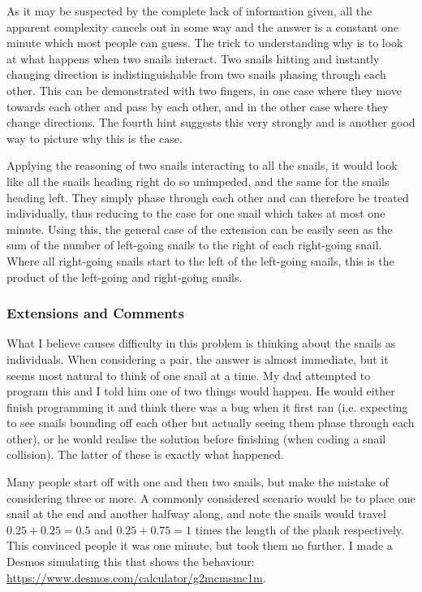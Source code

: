 As it may be suspected by the complete lack of information given, all the apparent complexity cancels out in some way and the answer is a constant one minute which most people can guess. The trick to understanding why is to look at what happens when two snails interact. Two snails hitting and instantly changing direction is indistinguishable from two snails phasing through each other. This can be demonstrated with two fingers, in one case where they move towards each other and pass by each other, and in the other case where they change directions. The fourth hint suggests this very strongly and is another good way to picture why this is the case.

Applying the reasoning of two snails interacting to all the snails, it would look like all the snails heading right do so unimpeded, and the same for the snails heading left. They simply phase through each other and can therefore be treated individually, thus reducing to the case for one snail which takes at most one minute. Using this, the general case of the extension can be easily seen as the sum of the number of left-going snails to the right of each right-going snail. Where all right-going snails start to the left of the left-going snails, this is the product of the left-going and right-going snails.

\subsubsection{Extensions and Comments}

What I believe causes difficulty in this problem is thinking about the snails as individuals. When considering a pair, the answer is almost immediate, but it seems most natural to think of one snail at a time. My dad attempted to program this and I told him one of two things would happen. He would either finish programming it and think there was a bug when it first ran (i.e. expecting to see snails bounding off each other but actually seeing them phase through each other), or he would realise the solution before finishing (when coding a snail collision). The latter of these is exactly what happened.

Many people start off with one and then two snails, but make the mistake of considering three or more. A commonly considered scenario would be to place one snail at the end and another halfway along, and note the snails would travel $0.25 + 0.25 = 0.5$ and $0.25 + 0.75 = 1$ times the length of the plank respectively. This convinced people it was one minute, but took them no further. I made a Desmos simulating this that shows the behaviour: \url{https://www.desmos.com/calculator/g2mcmsmc1m}.

